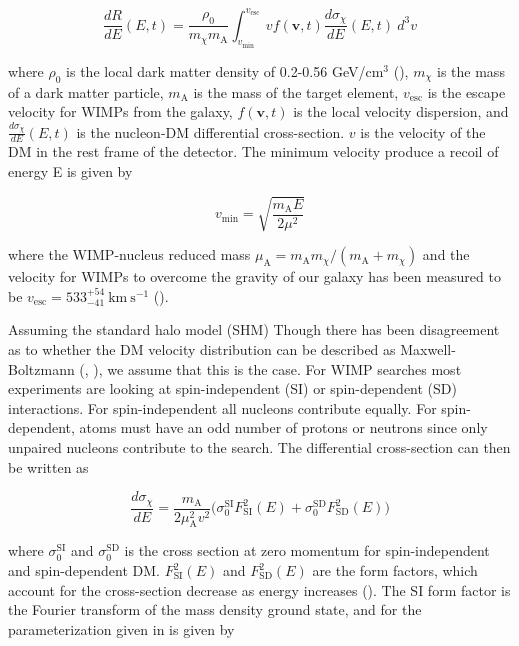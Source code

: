 \begin{equation} \label{eq:dr_de}
\frac{dR}{dE}(E, t) = \frac{\rho_{0}}{m_{\chi}m_{\mathrm{A}}} \int_{v_{\mathrm{min}}}^{v_{\mathrm{esc}}}
v f(\boldsymbol{v}, t) \frac{d\sigma_{\chi}}{dE}(E, t)\ d^{3}v
\end{equation}

\noindent where $\rho_{0}$ is the local dark matter density of 0.2-0.56 GeV/cm$^{3}$ (), $m_{\chi}$ is
the mass of a
dark matter particle, $m_{\mathrm{A}}$ is the mass of the target element, $v_{\mathrm{esc}}$ is the escape velocity for WIMPs from the galaxy,
$f(\boldsymbol{v}, t)$ is the local velocity dispersion, and $\frac{d\sigma_{\chi}}{dE}(E, t)$ is the nucleon-DM differential
cross-section.  $v$ is the velocity of the DM in the rest frame of the detector.  The minimum velocity produce
a recoil of energy E is given by

\begin{equation}
v_{\mathrm{min}} = \sqrt{\frac{m_{\mathrm{A}} E}{2 \mu^{2}}}
\end{equation}

\noindent where the WIMP-nucleus reduced mass $\mu_{\mathrm{A}} = m_{\mathrm{A}} m_{\chi} /( m_{\mathrm{A}} + m_{\chi})$
and the velocity for
WIMPs to overcome the gravity of our galaxy has been measured to be $v_{\mathrm{esc}} = 533_{-41}^{+54}\ \mathrm{km\ s^{-1}}$
().

Assuming the standard halo model (SHM)
Though there has been disagreement as to whether the DM velocity distribution can be described as Maxwell-Boltzmann
(, ), we assume that this is the case.  For WIMP searches most experiments
are looking at spin-independent (SI) or spin-dependent (SD) interactions.  For spin-independent all nucleons
contribute equally.  For spin-dependent, atoms must have an odd number
of protons or neutrons since only unpaired nucleons contribute to the search.  The differential cross-section can then be written as

\begin{equation} \label{eq:diff_sigma_si}
\frac{d \sigma_{\chi}}{dE} = \frac{m_{\mathrm{A}}}{2 \mu_{\mathrm{A}}^{2} v^{2}} \big( \sigma_{0}^{\mathrm{SI}} F_{\mathrm{SI}}^{2}(E) +
\sigma_{0}^{\mathrm{SD}} F_{\mathrm{SD}}^{2}(E) \big)
\end{equation}

\noindent where $\sigma_{0}^{\mathrm{SI}}$ and $\sigma_{0}^{\mathrm{SD}}$ is the cross section at zero momentum for
spin-independent and spin-dependent DM.  $F_{\mathrm{SI}}^{2}(E)$ and $F_{\mathrm{SD}}^{2}(E)$ are the form factors, which
account for the cross-section decrease as energy increases ().  The SI form factor is
the Fourier transform of the mass density ground state, and for the parameterization given in  is given by

